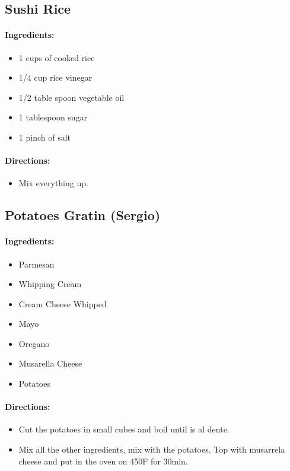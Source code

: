 \documentclass{article}
\begin{document}
\subsection{Sushi Rice}

\paragraph{Ingredients:}
\begin{itemize}
    \item 1 cups of cooked rice
    \item 1/4 cup rice vinegar
    \item 1/2 table spoon vegetable oil
    \item 1 tablespoon sugar
    \item 1 pinch of salt
\end{itemize}

\paragraph{Directions:}
\begin{itemize}
    \item Mix everything up.
\end{itemize}

\subsection{Potatoes Gratin (Sergio)}

\paragraph{Ingredients:}
\begin{itemize}
    \item Parmesan
    \item Whipping Cream
    \item Cream Cheese Whipped
    \item Mayo
    \item Oregano
    \item Musarella Cheese
    \item Potatoes
\end{itemize}

\paragraph{Directions:}
\begin{itemize}
    \item Cut the potatoes in small cubes and boil until is al dente.
    \item Mix all the other ingredients, mix with the potatoes. Top with musarrela cheese and put in the oven on 450F for 30min.
\end{itemize}
\end{document}
